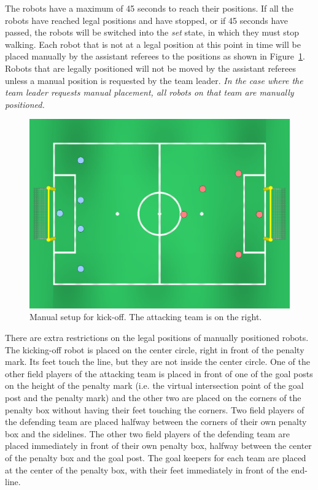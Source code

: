 \documentclass[12pt]{article}
\newcommand{\KickOffAutoTime}{45 seconds\xspace}
\begin{document}
The robots have a maximum of \KickOffAutoTime to reach their positions. If all the robots have reached legal positions and have stopped, or if \KickOffAutoTime have passed, the robots will be switched into the \emph{set} state, in which they must stop walking. Each robot that is not at a legal position at this point in time will be placed manually by the assistant referees to the positions as shown in Figure~\ref{fig:ko}. Robots that are legally positioned will not be moved by the assistant referees unless a manual position is requested by the team leader.
\emph{In the case where the team leader requests manual placement, all robots on that team are manually positioned.}


\begin{figure}[t]
\centerline{\includegraphics[width=\columnwidth]{figs/manual_placement_2013.pdf}}
\caption{Manual setup for kick-off.  The attacking team is on the right.}
\label{fig:ko}
\end{figure}

There are extra restrictions on the legal positions of manually positioned robots. The kicking-off robot is placed on the center circle, right in front of the penalty mark. Its feet touch the line, but they are not inside the center circle. 
One of the other field players of the attacking team is placed in front of one of the goal posts on the height of the penalty mark (i.e. the virtual intersection point of the goal post and the penalty mark) and the other two are placed on the corners of the penalty box without having their feet touching the corners. 
Two field players of the defending team are placed halfway between the corners of their own penalty box and the sidelines. The other two field players of the defending team are placed immediately in front of their own penalty box, halfway between the center of the penalty box and the goal post.  The goal keepers for each team are placed at the center of the penalty box, with their feet immediately in front of the end-line.
\end{document}

